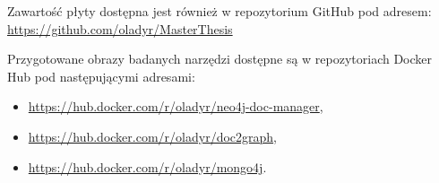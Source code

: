\documentclass[a4paper,twoside,12pt]{book}
\begin{document}
\begin{appendices}
Zawartość płyty dostępna jest również w repozytorium GitHub pod adresem:
\url{https://github.com/oladyr/MasterThesis}

\vspace{0.3cm}

Przygotowane obrazy badanych narzędzi dostępne są w repozytoriach Docker Hub pod następującymi adresami:
\begin{itemize}
\item \url{https://hub.docker.com/r/oladyr/neo4j-doc-manager},
\item \url{https://hub.docker.com/r/oladyr/doc2graph},
\item \url{https://hub.docker.com/r/oladyr/mongo4j}.
\end{itemize}


\listoffigures
{}

\renewcommand*{\lstlistlistingname}{Spis listingów}
\lstlistoflistings
	
\end{appendices}
\end{document}
